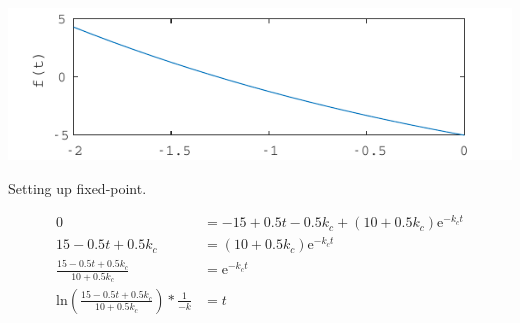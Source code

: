 \documentclass{article}
\begin{document}
  \begin{center}
    \includegraphics{figs/t5_check_2.pdf}
  \end{center}

  Setting up fixed-point.

  \begin{align*}
    0 &= -15 + 0.5t - 0.5k_c + (10 + 0.5k_c)\mathrm{e}^{-k_ct} \\
    15 - 0.5t + 0.5k_c &= (10 + 0.5k_c)\mathrm{e}^{-k_ct} \\
    \frac{15 - 0.5t + 0.5k_c}{10 + 0.5k_c} &= \mathrm{e}^{-k_ct} \\
    \mathrm{ln}(\frac{15 - 0.5t + 0.5k_c}{10 + 0.5k_c}) * \frac{1}{-k} &= t \\
  \end{align*}

\end{document}
